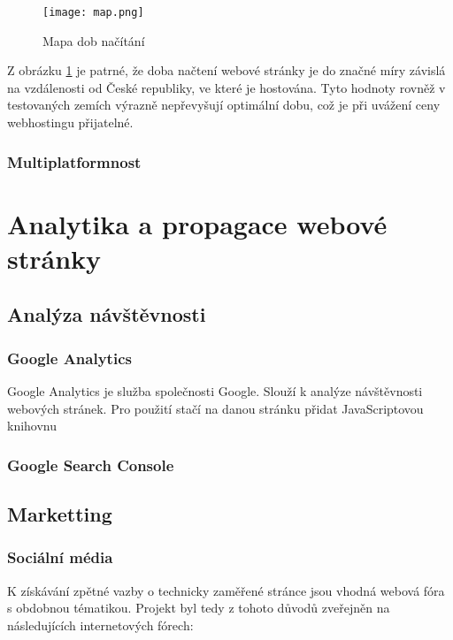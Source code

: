 \documentclass[a4paper, 12pt]{article}
\begin{document}
  \begin{figure}[H]
    \texttt{[image: map.png]}
    \caption{Mapa dob načítání} \label{img:Mapa dob načítání}
  \end{figure}

  Z obrázku \ref{img:Mapa dob načítání} je patrné, že doba načtení webové stránky je do značné míry závislá na vzdálenosti od České republiky, ve které je hostována. Tyto hodnoty rovněž v testovaných zemích výrazně nepřevyšují optimální dobu, což je při uvážení ceny webhostingu přijatelné.


  \subsubsection{Multiplatformnost}

  \section{Analytika a propagace webové stránky}

  \subsection{Analýza návštěvnosti}

  \subsubsection{Google Analytics}
  Google Analytics je služba společnosti Google. Slouží k analýze návštěvnosti webových stránek. Pro použití stačí na danou stránku přidat JavaScriptovou knihovnu %



  \subsubsection{Google Search Console}

  \subsection{Marketting}

  \subsubsection{Sociální média}
  K získávání zpětné vazby o technicky zaměřené stránce jsou vhodná webová fóra s obdobnou tématikou. Projekt byl tedy z tohoto důvodů zveřejněn na následujících internetových fórech:
\end{document}

